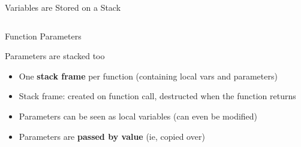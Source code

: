 \begin{Coupe}
\begin{frame}{Variables are Stored on a Stack}
\begin{minipage}{.5\linewidth}
\begin{minipage}[b]{.18\linewidth}
{            
        }
    \end{minipage}$\!\!$\begin{minipage}[b]{.18\linewidth} %
    \end{minipage}
      
  \end{minipage}
\end{frame}
\begin{frame}{Function Parameters}  
  \begin{block}{Parameters are stacked too}
    \begin{itemize}
    \item One \textbf{\alert{stack frame}} per function (containing local vars and parameters)
    \item Stack frame: created on function call,  destructed when the function returns
    \item Parameters can be seen as local variables (can even be modified)
    \item Parameters are \textbf{\alert{passed by value}} (ie, copied over)
    \end{itemize}
  \end{block}  


\end{frame}
\end{Coupe}
